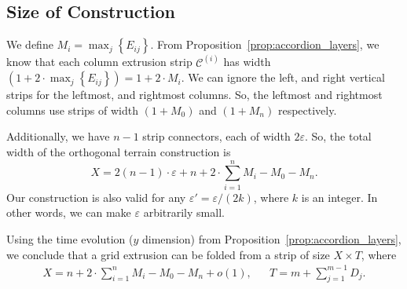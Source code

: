 \subsection{Size of Construction}
\label{sec:size}

We define $M_i = \max_j\left\{ E_{ij}\right\}$.
From Proposition~\ref{prop:accordion_layers}, we know that each column extrusion strip
$\mathcal C^{(i)}$ has width $\left( 1 + 2\cdot\max_j\left\{ E_{ij}\right\}\right) = 1+2\cdot M_i$.
We can ignore the left, and right vertical strips for the leftmost, and rightmost columns.
So, the leftmost and rightmost columns use strips of width $(1 + M_0)$ and $(1 + M_n)$ respectively.

Additionally, we have $n-1$ strip connectors, each of width $2\varepsilon$.
So, the total width of the orthogonal terrain construction is
$$X = 2(n-1)\cdot\varepsilon + n + 2\cdot\sum\limits_{i=1}^n M_i - M_0 - M_n.$$
Our construction is also valid for any $\varepsilon' = \varepsilon/(2k)$, where $k$ is an integer.
In other words, we can make $\varepsilon$ arbitrarily small.

\begin{theorem}
\label{thm:grid_extrusion}
Using the time evolution ($y$ dimension) from Proposition~\ref{prop:accordion_layers},
we conclude that a grid extrusion can be folded from a strip of size $X\times T$, where
\begin{align*}
X = n + 2\cdot\sum\limits_{i=1}^n M_i - M_0 - M_n + o(1), && T = m + \sum\limits^{m-1}_{j=1} D_j.
\end{align*}
\end{theorem}
